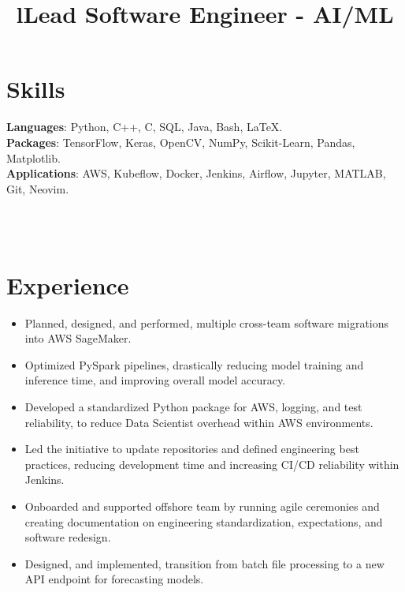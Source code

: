 \documentclass[margin]{res}
\begin{document}
\begin{resume}

	\section{Skills}
	\phantom{spacing}
	\par
	\textbf{Languages}: Python, C++, C, SQL, Java, Bash, \LaTeX.
	\\
	\textbf{Packages}: TensorFlow, Keras, OpenCV, NumPy, Scikit-Learn, Pandas, Matplotlib.
	\\
	\textbf{Applications}: AWS, Kubeflow, Docker, Jenkins, Airflow, Jupyter, MATLAB, Git, Neovim.

	\begin{format}
		\title{l}\\
		\\
	\end{format}

	\section{Experience}
	\phantom{spacing}
	\title{\textbf{Lead Software Engineer - AI/ML}}
	\begin{position}
		\begin{itemize}[noitemsep, topsep=0pt]
			\item Planned, designed, and performed, multiple cross-team software migrations into AWS SageMaker.
			\item Optimized PySpark pipelines, drastically reducing model training and inference time, and improving overall model accuracy.
			\item Developed a standardized Python package for AWS, logging, and test reliability, to reduce Data Scientist overhead within AWS environments.
			\item Led the initiative to update repositories and defined engineering best practices, reducing development time and increasing CI/CD reliability within Jenkins.
			\item Onboarded and supported offshore team by running agile ceremonies and creating documentation on engineering standardization, expectations, and software redesign.
			\item Designed, and implemented, transition from batch file processing to a new API endpoint for forecasting models.
		\end{itemize}
	\end{position}



\end{resume}
\end{document}
